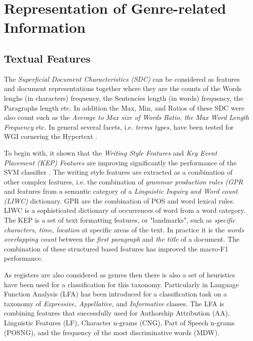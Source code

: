 \section{Representation of Genre-related Information}

\subsection{Textual Features}

The \textit{Superficial Document Characteristics (SDC)} can be considered as features and document representations together where they are the counts of the Words lenghs (in characters) frequency, the Sentencies length (in words) frequency, the Paragraphs length etc. In addition the Max, Min, and Ratios of these SDC were also count such as the \textit{Average to Max size of Words Ratio, the Max Word Length Frequency} etc. In general several facets, i.e. \textit{terms types}, have been tested for WGI cornering the Hypertext \parencite{feldman2009classifying,santini2005linguistic}.

To begin with, it shown that the \textit{Writing Style Features} and \textit{Key Event Placement (KEP) Features} are improving significantly the performance of the SVM classifier \parencite{dai2018fine}.  The writing style features are extracted as a combination of  other complex features, i.e. the combination of \textit{grammar production rules (GPR} and features from a semantic category of a \textit{Linguistic Inquiry and Word count (LIWC)} dictionary. GPR are the combination of POS and word lexical rules. LIWC is a sophisticated dictionary of occurrences of word from a word category. The KEP is a set of text formatting features, or "landmarks", such as \textit{specific characters, time, location} at specific areas of the text. In practice it is the \textit{words overlapping count} between the \textit{first paragraph} and \textit{the title} of a document. The combination of these structured based features has improved the macro-F1 performance.

As registers are also considered as genres then there is also a set of heuristics have been used for a classification for this taxonomy. Particularly in \parencite{onan2018ensemble} Language Function Analysis (LFA) has been introduced for a classification task on a taxonomy of \textit{Expressive, Appellative,} and \textit{Informative} classes. The LFA is combining features that successfully used for Authorship Attribution (AA), Linguistic Features (LF), Character n-grams (CNG), Part of Speech n-grams (POSNG), and the frequency of the most discriminative words (MDW). 

